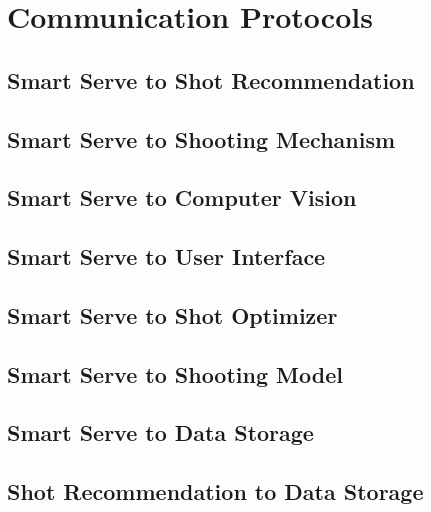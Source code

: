 \documentclass[11pt]{article}
\begin{document}
\section{Communication Protocols}
\subsection{Smart Serve to Shot Recommendation}
\subsection{Smart Serve to Shooting Mechanism}
\subsection{Smart Serve to Computer Vision}
\subsection{Smart Serve to User Interface}
\subsection{Smart Serve to Shot Optimizer}
\subsection{Smart Serve to Shooting Model}
\subsection{Smart Serve to Data Storage}
\subsection{Shot Recommendation to Data Storage}
\end{document}
